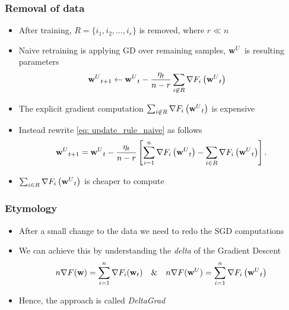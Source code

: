 \documentclass{beamer}
\begin{document}
\begin{frame}
  \frametitle{Removal of data}
  \begin{itemize}
    \item After training,  $R = \{i_1,i_2,\dots,i_r\}$ is removed, where $r \ll n$
    \item Naive retraining is applying GD over remaining samples, $\textbf{w}^{U}$ is resulting parameters
    \begin{align}\label{eq: update_rule_naive} 
      & {\textbf{w}^{U}}_{t+1} \leftarrow {\textbf{w}^{U}}_{t} - \frac{\eta_t}{n-r}\sum_{\substack{i \not\in R}} \nabla F_i\left({\textbf{w}^{U}}_{t}\right) 
    \end{align}
    \item The explicit gradient computation $\sum_{\substack{i \not\in R}} \nabla F_i\left({\textbf{w}^{U}}_{t}\right)$ is expensive
    \item Instead rewrite \eqref{eq: update_rule_naive} as follows 
    \begin{align}\label{eq: approx_w_t}
      \begin{split}
      {\textbf{w}^{U}}_{t+1} 
               = {\textbf{w}^{U}}_{t} - \frac{\eta_t}{n-r}\left[\sum_{i=1}^{n} \nabla F_{i}\left({\textbf{w}^{U}}_{t}\right) - \sum_{\substack{i \in R}} \nabla F_i\left({\textbf{w}^{U}}_{t}\right)\right].
      \end{split}
      \end{align}
      \item $\sum_{\substack{i \in R}} \nabla F_i\left({\textbf{w}^{U}}_{t}\right)$ is cheaper to compute
  \end{itemize}
\end{frame}

\begin{frame}
  \frametitle{Etymology}
  \begin{itemize}
    \item After a small change to the data we need to redo the SGD computations
    \item We can achieve this by understanding the \textit{delta} of the Gradient Descent 
    \[ 
      n\nabla F(\textbf{w}) = \sum_{i=1}^{n}\nabla F_{i}(\textbf{w}_t) \quad \& \quad n\nabla F({\textbf{w}^{U}}) =  \sum_{i=1}^{n} \nabla F_{i}\left({\textbf{w}^{U}}_{t}\right)
    \]
    \item Hence, the approach is called \textit{DeltaGrad}
  \end{itemize}
\end{frame}
\end{document}

